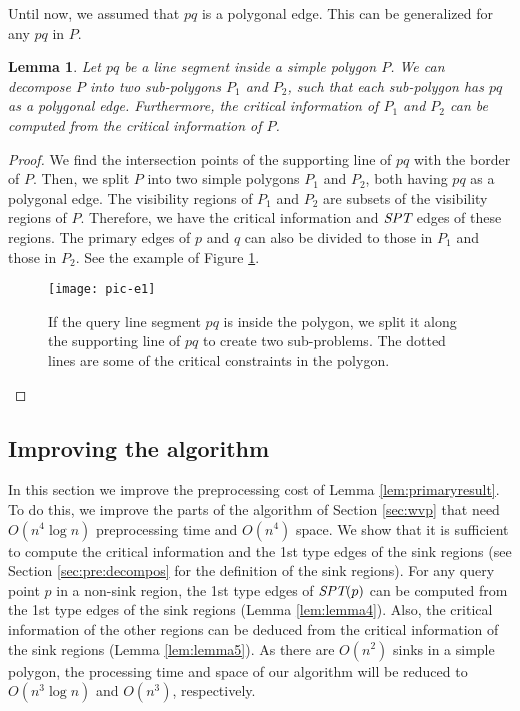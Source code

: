 \documentclass[5p]{elsarticle}
\newtheorem{lemma}[theorem]{Lemma}
\def\SPT{\mbox{\it{SPT}}}
\def\P{\mbox{${P}$}}
\begin{document}
Until now, we assumed that $pq$ is a polygonal edge.
This can be generalized for any $pq$ in $\P$. 

\begin{lemma} \label{lemma3.1}
Let $pq$ be a line segment inside a simple polygon $\P$. 
We can decompose $\P$ into two sub-polygons $\P_1$ and $\P_2$, such that
each sub-polygon has $pq$ as a polygonal edge. 
Furthermore, the critical information of $\P_1$ and $\P_2$ 
can be computed from the critical information of $\P$.
\end{lemma}
\begin{proof}
We find the intersection points of the supporting line of $pq$ with the
border of $\P$. Then, we split $\P$ into two simple polygons $\P_1$ and $\P_2$, 
both having $pq$ as a polygonal edge.
The visibility regions of $\P_1$ and $\P_2$ are subsets of the visibility regions of 
$\P$. Therefore, we have the critical information and $\SPT$ edges of these regions.
The primary edges of $p$ and $q$ can also be divided to those in $\P_1$ and those
in $\P_2$.
See the example of Figure \ref{fig:split}. 

\begin{figure}[h]
  \centering
  \texttt{[image: pic-e1]}   
  \caption{If the query line segment $pq$ is inside the polygon, we split it along the supporting line of $pq$
  to create two sub-problems. 
  The dotted lines are some of the critical constraints in the polygon. }
  \label{fig:split}
\end{figure}
\end{proof}

 


\subsection{Improving the algorithm} \label{sec:improve}
In this section we improve the preprocessing cost of Lemma \ref{lem:primaryresult}.
To do this, we improve the parts of the algorithm of Section \ref{sec:wvp} 
that need $O(n^4 \log n)$ preprocessing time and $O(n^4)$ space.
We show that it is sufficient to compute the critical information and the 1st type edges 
of the sink regions (see Section \ref{sec:pre:decompos} for the definition of the 
sink regions). 
For any query point $p$ in a non-sink region, the 1st type edges of $\SPT(p)$ 
can be computed from the 1st type edges 
of the sink regions (Lemma \ref{lem:lemma4}).
Also, the critical information of the other regions
can be deduced from the critical information of the sink regions (Lemma \ref{lem:lemma5}).
As there are $O(n^2)$ sinks in a simple polygon, the processing
time and space of our algorithm will be reduced to $O(n^3 \log n)$ and $O(n^3)$, respectively.
\end{document}
